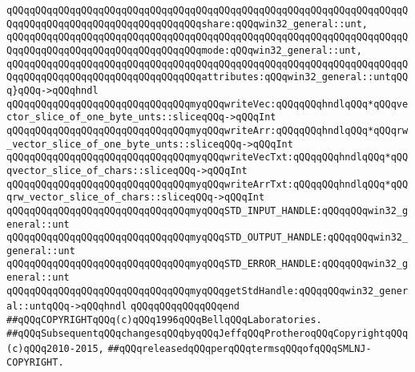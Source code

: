 \verb|qQQqqQQqqQQqqQQqqQQqqQQqqQQqqQQqqQQqqQQqqQQqqQQqqQQqqQQqqQQqqQQqqQQqqQQqqQQqqQQqqQQqqQQqqQQqqQQqqQQqqQQqshare:qQQqwin32_general::unt,|\newline
\verb|qQQqqQQqqQQqqQQqqQQqqQQqqQQqqQQqqQQqqQQqqQQqqQQqqQQqqQQqqQQqqQQqqQQqqQQqqQQqqQQqqQQqqQQqqQQqqQQqqQQqqQQqmode:qQQqwin32_general::unt,|\newline
\verb|qQQqqQQqqQQqqQQqqQQqqQQqqQQqqQQqqQQqqQQqqQQqqQQqqQQqqQQqqQQqqQQqqQQqqQQqqQQqqQQqqQQqqQQqqQQqqQQqqQQqqQQqattributes:qQQqwin32_general::untqQQq}qQQq->qQQqhndl|\newline
\newline
\verb|qQQqqQQqqQQqqQQqqQQqqQQqqQQqqQQqmyqQQqwriteVec:qQQqqQQqhndlqQQq*qQQqvector_slice_of_one_byte_unts::sliceqQQq->qQQqInt|\newline
\verb|qQQqqQQqqQQqqQQqqQQqqQQqqQQqqQQqmyqQQqwriteArr:qQQqqQQqhndlqQQq*qQQqrw_vector_slice_of_one_byte_unts::sliceqQQq->qQQqInt|\newline
\verb|qQQqqQQqqQQqqQQqqQQqqQQqqQQqqQQqmyqQQqwriteVecTxt:qQQqqQQqhndlqQQq*qQQqvector_slice_of_chars::sliceqQQq->qQQqInt|\newline
\verb|qQQqqQQqqQQqqQQqqQQqqQQqqQQqqQQqmyqQQqwriteArrTxt:qQQqqQQqhndlqQQq*qQQqrw_vector_slice_of_chars::sliceqQQq->qQQqInt|\newline
\newline
\verb|qQQqqQQqqQQqqQQqqQQqqQQqqQQqqQQqmyqQQqSTD_INPUT_HANDLE:qQQqqQQqwin32_general::unt|\newline
\verb|qQQqqQQqqQQqqQQqqQQqqQQqqQQqqQQqmyqQQqSTD_OUTPUT_HANDLE:qQQqqQQqwin32_general::unt|\newline
\verb|qQQqqQQqqQQqqQQqqQQqqQQqqQQqqQQqmyqQQqSTD_ERROR_HANDLE:qQQqqQQqwin32_general::unt|\newline
\newline
\verb|qQQqqQQqqQQqqQQqqQQqqQQqqQQqqQQqmyqQQqgetStdHandle:qQQqqQQqwin32_general::untqQQq->qQQqhndl|\newline
\verb|qQQqqQQqqQQqqQQqend|\newline
\newline
\newline
\newline
\newline
\verb|##qQQqCOPYRIGHTqQQq(c)qQQq1996qQQqBellqQQqLaboratories.|\newline
\verb|##qQQqSubsequentqQQqchangesqQQqbyqQQqJeffqQQqProtheroqQQqCopyrightqQQq(c)qQQq2010-2015,|\newline
\verb|##qQQqreleasedqQQqperqQQqtermsqQQqofqQQqSMLNJ-COPYRIGHT.|\newline

